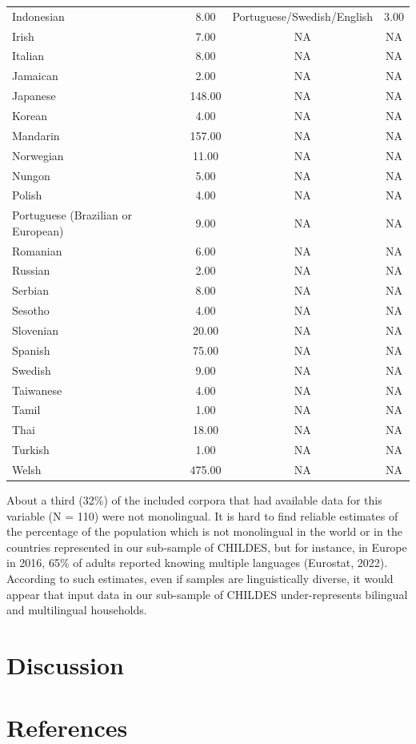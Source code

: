 \documentclass[
  man,floatsintext]{apa6}
\begin{document}
\begin{center}
\begin{ThreePartTable}
\begin{longtable}{lccc}
Indonesian & 8.00 & Portuguese/Swedish/English & 3.00\\
Irish & 7.00 & NA & NA\\
Italian & 8.00 & NA & NA\\
Jamaican & 2.00 & NA & NA\\
Japanese & 148.00 & NA & NA\\
Korean & 4.00 & NA & NA\\
Mandarin & 157.00 & NA & NA\\
Norwegian & 11.00 & NA & NA\\
Nungon & 5.00 & NA & NA\\
Polish & 4.00 & NA & NA\\
Portuguese (Brazilian or European) & 9.00 & NA & NA\\
Romanian & 6.00 & NA & NA\\
Russian & 2.00 & NA & NA\\
Serbian & 8.00 & NA & NA\\
Sesotho & 4.00 & NA & NA\\
Slovenian & 20.00 & NA & NA\\
Spanish & 75.00 & NA & NA\\
Swedish & 9.00 & NA & NA\\
Taiwanese & 4.00 & NA & NA\\
Tamil & 1.00 & NA & NA\\
Thai & 18.00 & NA & NA\\
Turkish & 1.00 & NA & NA\\
Welsh & 475.00 & NA & NA\\
\bottomrule
\end{longtable}

\end{ThreePartTable}
\end{center}

About a third (32\%) of the included corpora that had available data for this variable (N = 110) were not monolingual. It is hard to find reliable estimates of the percentage of the population which is not monolingual in the world or in the countries represented in our sub-sample of CHILDES, but for instance, in Europe in 2016, 65\% of adults reported knowing multiple languages (Eurostat, 2022). According to such estimates, even if samples are linguistically diverse, it would appear that input data in our sub-sample of CHILDES under-represents bilingual and multilingual households.

\section{Discussion}\label{discussion}

\newpage

\section{References}\label{references}
\end{document}
